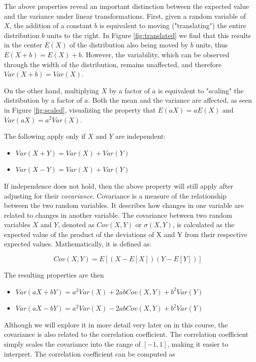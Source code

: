 \documentclass{article}
\begin{document}
The above properties reveal an important distinction between the expected value and the variance under linear transformations. First, given a random variable of $X$, the addition of a constant $b$ is equivalent to moving ("translating") the entire distribution $b$ units to the right. In Figure \ref{fig:translated} we find that this results in the center $E(X)$ of the distribution also being moved by $b$ units, thus $E(X + b) = E(X) + b$. However, the variability, which can be observed through the width of the distribution, remains unaffected, and therefore $Var(X + b) = Var(X)$.

On the other hand, multiplying $X$ by a factor of $a$ is equivalent to "scaling" the distribution by a factor of $a$. Both the mean and the variance are affected, as seen in Figure \ref{fig:scaled}, visualizing the property that $E(aX) = a E(X)$ and $Var(aX) = a^2 Var(X)$.

The following apply only if $X$ and $Y$ are independent:

\begin{itemize}
\item $Var(X + Y) = Var(X) + Var(Y)$
\item $Var(X - Y) = Var(X) + Var(Y)$
\end{itemize}

If independence does not hold, then the above property will still apply after adjusting for their \emph{covariance}. Covariance is a measure of the relationship between the two random variables. It describes how changes in one variable are related to changes in another variable. The covariance between two random variables $X$ and $Y$, denoted as $Cov(X, Y)$ or $\sigma(X, Y)$, is calculated as the expected value of the product of the deviations of X and Y from their respective expected values. Mathematically, it is defined as:

$$
Cov(X, Y) = E[(X - E[X])(Y - E[Y])]
$$

The resulting properties are then

\begin{itemize}
\item $Var(aX + bY) = a^2 Var(X) + 2ab Cov(X,Y) + b^2 Var(Y)$
\item $Var(aX - bY) = a^2 Var(X) - 2ab Cov(X,Y) + b^2 Var(Y)$
\end{itemize}

Although we will explore it in more detail very later on in this course, the covariance is also related to the correlation coefficient. The correlation coefficient simply scales the covariance into the range of $[-1,1]$, making it easier to interpret. The correlation coefficient can be computed as
\end{document}
